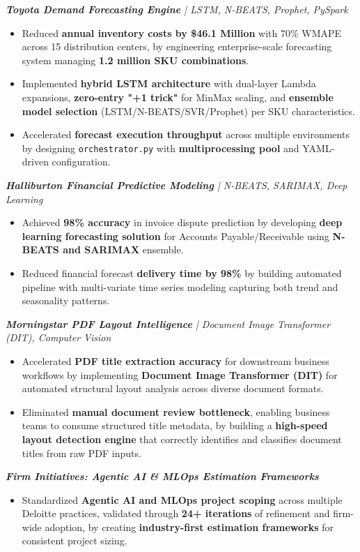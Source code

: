 \documentclass[letterpaper,10pt]{article}
\newcommand{\resumeItem}[1]{
  \item\small{
    {#1 \vspace{-2pt}}
  }
}
\newcommand{\resumeItemListStart}{\begin{itemize}}
\newcommand{\resumeItemListEnd}{\end{itemize}\vspace{-5pt}}
\begin{document}
      \vspace{12pt}
      \textit{\small\textbf{Toyota Demand Forecasting Engine} | LSTM, N-BEATS, Prophet, PySpark}
      \resumeItemListStart
        \resumeItem{Reduced \textbf{annual inventory costs by \$46.1 Million} with 70\% WMAPE across 15 distribution centers, by engineering enterprise-scale forecasting system managing \textbf{1.2 million SKU combinations}.}
        \resumeItem{Implemented \textbf{hybrid LSTM architecture} with dual-layer Lambda expansions, \textbf{zero-entry "+1 trick"} for MinMax scaling, and \textbf{ensemble model selection} (LSTM/N-BEATS/SVR/Prophet) per SKU characteristics.}
        \resumeItem{Accelerated \textbf{forecast execution throughput} across multiple environments by designing \texttt{orchestrator.py} with \textbf{multiprocessing pool} and YAML-driven configuration.}
      \resumeItemListEnd

      \vspace{12pt}
      \textit{\small\textbf{Halliburton Financial Predictive Modeling} | N-BEATS, SARIMAX, Deep Learning}
      \resumeItemListStart
        \resumeItem{Achieved \textbf{98\% accuracy} in invoice dispute prediction by developing \textbf{deep learning forecasting solution} for Accounts Payable/Receivable using \textbf{N-BEATS and SARIMAX} ensemble.}
        \resumeItem{Reduced financial forecast \textbf{delivery time by 98\%} by building automated pipeline with multi-variate time series modeling capturing both trend and seasonality patterns.}
      \resumeItemListEnd

      \vspace{12pt}
      \textit{\small\textbf{Morningstar PDF Layout Intelligence} | Document Image Transformer (DIT), Computer Vision}
      \resumeItemListStart
        \resumeItem{Accelerated \textbf{PDF title extraction accuracy} for downstream business workflows by implementing \textbf{Document Image Transformer (DIT)} for automated structural layout analysis across diverse document formats.}
        \resumeItem{Eliminated \textbf{manual document review bottleneck}, enabling business teams to consume structured title metadata, by building a \textbf{high-speed layout detection engine} that correctly identifies and classifies document titles from raw PDF inputs.}
      \resumeItemListEnd

      \vspace{12pt}
      \textit{\small\textbf{Firm Initiatives: Agentic AI \& MLOps Estimation Frameworks}}
      \resumeItemListStart
        \resumeItem{Standardized \textbf{Agentic AI and MLOps project scoping} across multiple Deloitte practices, validated through \textbf{24+ iterations} of refinement and firm-wide adoption, by creating \textbf{industry-first estimation frameworks} for consistent project sizing.}
      \resumeItemListEnd
\end{document}
